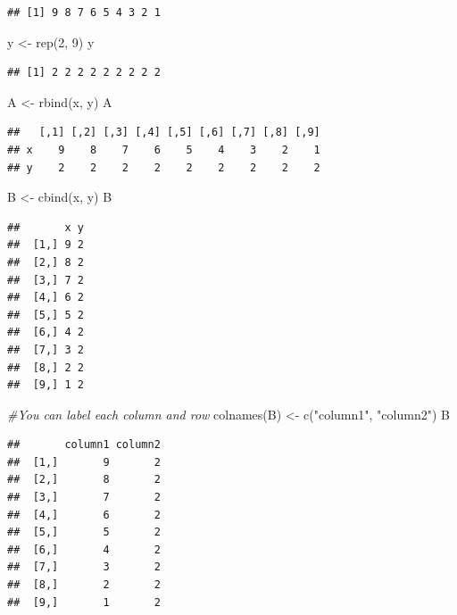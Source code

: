 \documentclass[
]{book}
\newenvironment{Shaded}{\begin{snugshade}}{\end{snugshade}}
\newcommand{\CommentTok}[1]{\textcolor[rgb]{0.56,0.35,0.01}{\textit{#1}}}
\newcommand{\DecValTok}[1]{\textcolor[rgb]{0.00,0.00,0.81}{#1}}
\newcommand{\FunctionTok}[1]{\textcolor[rgb]{0.00,0.00,0.00}{#1}}
\newcommand{\NormalTok}[1]{#1}
\newcommand{\OtherTok}[1]{\textcolor[rgb]{0.56,0.35,0.01}{#1}}
\newcommand{\StringTok}[1]{\textcolor[rgb]{0.31,0.60,0.02}{#1}}
\theoremstyle{definition}
\theoremstyle{definition}
\theoremstyle{definition}
\theoremstyle{definition}
\theoremstyle{remark}
\begin{document}
\begin{verbatim}
## [1] 9 8 7 6 5 4 3 2 1
\end{verbatim}

\begin{Shaded}
\begin{Highlighting}[]
\NormalTok{y }\OtherTok{\textless{}{-}} \FunctionTok{rep}\NormalTok{(}\DecValTok{2}\NormalTok{, }\DecValTok{9}\NormalTok{)}
\NormalTok{y}
\end{Highlighting}
\end{Shaded}

\begin{verbatim}
## [1] 2 2 2 2 2 2 2 2 2
\end{verbatim}

\begin{Shaded}
\begin{Highlighting}[]
\NormalTok{A }\OtherTok{\textless{}{-}} \FunctionTok{rbind}\NormalTok{(x, y)}
\NormalTok{A}
\end{Highlighting}
\end{Shaded}

\begin{verbatim}
##   [,1] [,2] [,3] [,4] [,5] [,6] [,7] [,8] [,9]
## x    9    8    7    6    5    4    3    2    1
## y    2    2    2    2    2    2    2    2    2
\end{verbatim}

\begin{Shaded}
\begin{Highlighting}[]
\NormalTok{B }\OtherTok{\textless{}{-}} \FunctionTok{cbind}\NormalTok{(x, y)}
\NormalTok{B}
\end{Highlighting}
\end{Shaded}

\begin{verbatim}
##       x y
##  [1,] 9 2
##  [2,] 8 2
##  [3,] 7 2
##  [4,] 6 2
##  [5,] 5 2
##  [6,] 4 2
##  [7,] 3 2
##  [8,] 2 2
##  [9,] 1 2
\end{verbatim}

\begin{Shaded}
\begin{Highlighting}[]
\CommentTok{\#You can label each column and row}
\FunctionTok{colnames}\NormalTok{(B) }\OtherTok{\textless{}{-}} \FunctionTok{c}\NormalTok{(}\StringTok{"column1"}\NormalTok{, }\StringTok{"column2"}\NormalTok{)}
\NormalTok{B}
\end{Highlighting}
\end{Shaded}

\begin{verbatim}
##       column1 column2
##  [1,]       9       2
##  [2,]       8       2
##  [3,]       7       2
##  [4,]       6       2
##  [5,]       5       2
##  [6,]       4       2
##  [7,]       3       2
##  [8,]       2       2
##  [9,]       1       2
\end{verbatim}
\end{document}

